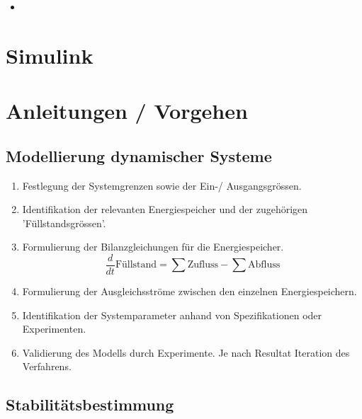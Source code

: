 \documentclass[
  10pt,
  a4paper,
]{article}
\newcommand{\VERB}{\Verb[commandchars=\\\{\}]}
\newcommand{\NormalTok}[1]{\textcolor[rgb]{0.14,0.16,0.18}{#1}}
\newcommand{\OperatorTok}[1]{\textcolor[rgb]{0.14,0.16,0.18}{#1}}
\newcommand{\VariableTok}[1]{\textcolor[rgb]{0.89,0.38,0.04}{#1}}
\providecommand{\tightlist}{%
  \setlength{\itemsep}{0pt}\setlength{\parskip}{0pt}}\usepackage{longtable,booktabs,array}
\numberwithin{equation}{section}
\begin{document}
\begin{multicols}{2}
\begin{itemize}
\tightlist
\item
\end{itemize}

\hypertarget{simulink}{%
\section{Simulink}\label{simulink}}

\hypertarget{anleitungen-vorgehen}{%
\section{\texorpdfstring{\faFile*[regular] Anleitungen /
Vorgehen}{ Anleitungen / Vorgehen}}\label{anleitungen-vorgehen}}

\hypertarget{modellierung-dynamischer-systeme}{%
\subsection{Modellierung dynamischer
Systeme}\label{modellierung-dynamischer-systeme}}

\begin{enumerate}
\def\labelenumi{\arabic{enumi}.}
\tightlist
\item
  Festlegung der Systemgrenzen sowie der Ein-/ Ausgangsgrössen.
\item
  Identifikation der relevanten Energiespeicher und der zugehörigen
  'Füllstandsgrössen'.
\item
  Formulierung der Bilanzgleichungen für die Energiespeicher. \[
  \frac{d}{dt}\text{Füllstand} = \sum{\text{Zufluss}}-\sum{\text{Abfluss}}
  \]
\item
  Formulierung der Ausgleichsströme zwischen den einzelnen
  Energiespeichern.
\item
  Identifikation der Systemparameter anhand von Spezifikationen oder
  Experimenten.
\item
  Validierung des Modells durch Experimente. Je nach Resultat Iteration
  des Verfahrens.
\end{enumerate}

\hypertarget{stabilituxe4tsbestimmung}{%
\subsection{Stabilitätsbestimmung}\label{stabilituxe4tsbestimmung}}



\end{multicols}
\end{document}
